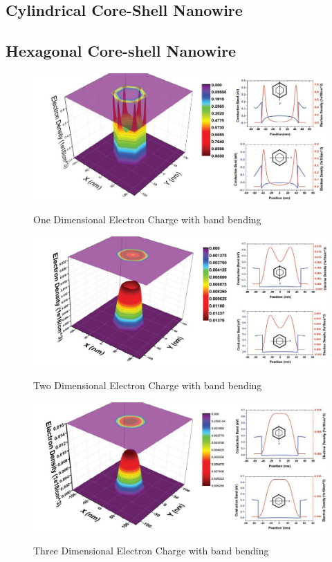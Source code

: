 \subsection{Cylindrical Core-Shell Nanowire}

\subsection{Hexagonal Core-shell Nanowire} \label{sec:indv_lines}

\begin{figure}
  \caption{One Dimensional Electron Charge with band bending}
  \centering
  \includegraphics[width=\textwidth]{pictures/ED/1DCharge}
  \label{1DCharge}
\end{figure}

\begin{figure}
  \caption{Two Dimensional Electron Charge with band bending}
  \centering
  \includegraphics[width=\textwidth]{pictures/ED/2DCharge}
  \label{2DCharge}
\end{figure}

\begin{figure}
  \caption{Three Dimensional Electron Charge with band bending}
  \centering
  \includegraphics[width=\textwidth]{pictures/ED/3DCharge}
  \label{3DCharge}
\end{figure}

